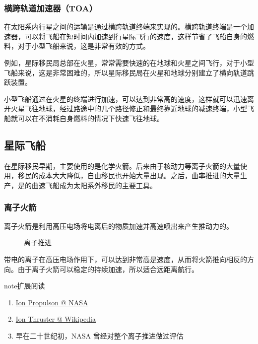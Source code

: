 \documentclass[letterpaper,10pt]{sphinxmanual}
\begin{document}

\subsubsection{横跨轨道加速器（TOA）}
\label{tech:toa}\label{tech:index-7}
在太阳系内行星之间的运输是通过横跨轨道终端来实现的。横跨轨道终端是一个加速器，可以将飞船在短时间内加速到行星际飞行的速度，这样节省了飞船自身的燃料，对于小型飞船来说，这是非常有效的方式。

例如，星际移民局总部在火星，常常需要快速的在地球和火星之间飞行，对于小型飞船来说，这是非常困难的，所以星际移民局在火星和地球分别建立了横向轨道跳跃装置。

小型飞船通过在火星的终端进行加速，可以达到非常高的速度，这样就可以迅速离开火星飞往地球，经过路途中的几个路径修正和最终靠近地球的减速终端，小型飞船就可以在不消耗自身燃料的情况下快速飞往地球。


\subsection{星际飞船}
\label{tech:id12}
在星际移民早期，主要使用的是化学火箭。后来由于核动力等离子火箭的大量使用，移民的成本大大降低，自由移民也开始大量出现。之后，曲率推进的大量生产，是的曲速飞船成为太阳系外移民的主要工具。


\subsubsection{离子火箭}
\label{tech:id13}
离子火箭是利用高压电场将电离后的物质加速并高速喷出来产生推动力的。
\begin{figure}[htbp]
\centering
\capstart
\caption{离子推进}\end{figure}

带电的离子在高压电场作用下，可以达到非常高是速度，从而将火箭推向相反的方向。由于离子火箭可以稳定的持续加速，所以适合远距离航行。

\begin{notice}{note}{扩展阅读}
\begin{enumerate}
\item {} 
\href{http://www.nasa.gov/centers/glenn/about/fs21grc.html}{Ion Propulson @ NASA}

\item {} 
\href{https://en.wikipedia.org/wiki/Ion\_thruster}{Ion Thruster @ Wikipedia}

\item {} 
早在二十世纪初，NASA 曾经对整个离子推进做过评估
\begin{figure}[htbp]
\centering
\end{figure}

\end{enumerate}
\end{notice}
\end{document}

